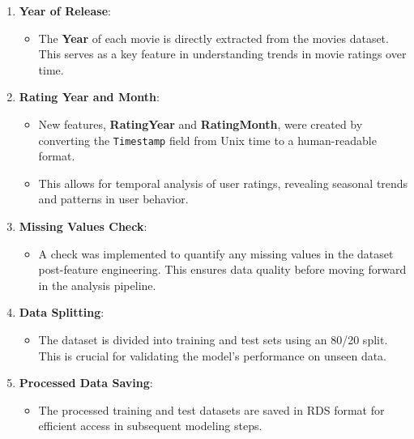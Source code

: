 \documentclass[
]{article}
\providecommand{\tightlist}{%
  \setlength{\itemsep}{0pt}\setlength{\parskip}{0pt}}
\begin{document}
\begin{enumerate}
\def\labelenumi{\arabic{enumi}.}
\item
  \textbf{Year of Release}:

  \begin{itemize}
  \tightlist
  \item
    The \textbf{Year} of each movie is directly extracted from the
    movies dataset. This serves as a key feature in understanding trends
    in movie ratings over time.
  \end{itemize}
\item
  \textbf{Rating Year and Month}:

  \begin{itemize}
  \tightlist
  \item
    New features, \textbf{RatingYear} and \textbf{RatingMonth}, were
    created by converting the \texttt{Timestamp} field from Unix time to
    a human-readable format.
  \item
    This allows for temporal analysis of user ratings, revealing
    seasonal trends and patterns in user behavior.
  \end{itemize}
\item
  \textbf{Missing Values Check}:

  \begin{itemize}
  \tightlist
  \item
    A check was implemented to quantify any missing values in the
    dataset post-feature engineering. This ensures data quality before
    moving forward in the analysis pipeline.
  \end{itemize}
\item
  \textbf{Data Splitting}:

  \begin{itemize}
  \tightlist
  \item
    The dataset is divided into training and test sets using an 80/20
    split. This is crucial for validating the model's performance on
    unseen data.
  \end{itemize}
\item
  \textbf{Processed Data Saving}:

  \begin{itemize}
  \tightlist
  \item
    The processed training and test datasets are saved in RDS format for
    efficient access in subsequent modeling steps.
  \end{itemize}
\end{enumerate}
\end{document}
